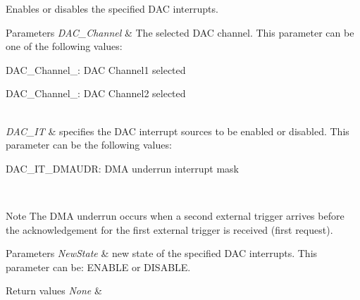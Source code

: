 Enables or disables the specified D\+AC interrupts. 


\begin{DoxyParams}{Parameters}
{\em D\+A\+C\+\_\+\+Channel} & The selected D\+AC channel. This parameter can be one of the following values\+: \begin{DoxyItemize}
\item D\+A\+C\+\_\+\+Channel\+\_\+: D\+AC Channel1 selected \item D\+A\+C\+\_\+\+Channel\+\_\+: D\+AC Channel2 selected \end{DoxyItemize}
\\
\hline
{\em D\+A\+C\+\_\+\+IT} & specifies the D\+AC interrupt sources to be enabled or disabled. This parameter can be the following values\+: \begin{DoxyItemize}
\item D\+A\+C\+\_\+\+I\+T\+\_\+\+D\+M\+A\+U\+DR\+: D\+MA underrun interrupt mask \end{DoxyItemize}
\\
\hline
\end{DoxyParams}
\begin{DoxyNote}{Note}
The D\+MA underrun occurs when a second external trigger arrives before the acknowledgement for the first external trigger is received (first request). 
\end{DoxyNote}

\begin{DoxyParams}{Parameters}
{\em New\+State} & new state of the specified D\+AC interrupts. This parameter can be\+: E\+N\+A\+B\+LE or D\+I\+S\+A\+B\+LE. \\
\hline
\end{DoxyParams}

\begin{DoxyRetVals}{Return values}
{\em None} & \\
\hline
\end{DoxyRetVals}
